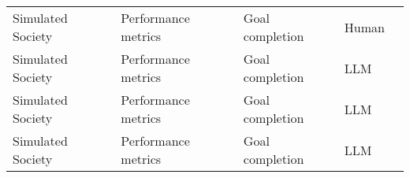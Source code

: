 \begin{small}
\begin{center}
\begin{longtable}{@{}p{}p{}p{}p{}p{}@{}}
Simulated Society        & Performance metrics                 & Goal completion                                                                                                                                                                                             & Human     & \cite{mou2024agentsensebenchmarkingsocialintelligence}                                                                                                                                                                                                                                                                                                                                                                                               \\
Simulated Society        & Performance metrics                 & Goal completion                                                                                                                                                                                             & LLM       & \cite{Zhou2024IsTT}                                                                                                                                                                                                                                                                                                                                                                            \\
Simulated Society        & Performance metrics                 & Goal completion                                                                                                                                                                                             & LLM       & \cite{mou2024agentsensebenchmarkingsocialintelligence}                                                                                                                                                                                                                                                                                                                                                                                               \\
Simulated Society        & Performance metrics                 & Goal completion                                                                                                                                                                                             & LLM       & \cite{zhou2024sotopiainteractiveevaluationsocial}                                                                                                                                                                                                                                                                                                                                                                                              \\

\end{longtable}
\end{center}
\end{small}
